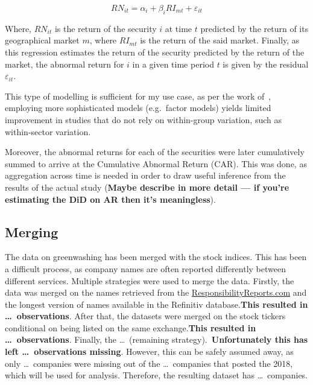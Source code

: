 \documentclass[12pt]{article}
\begin{document}
\begin{equation}\label{eq:reg_market_model}
    RN_{it} = \alpha_i + \beta_{i} RI_{mt} + \varepsilon_{it}
\end{equation}

Where, $RN_{it}$ is the return of the security $i$ at time $t$ predicted by the return of its geographical market $m$, where $RI_{mt}$ is the return of the said market. Finally, as this regression estimates the return of the security predicted by the return of the market, the abnormal return for $i$ in a given time period $t$ is given by the residual $\varepsilon_{it}$.

This type of modelling is sufficient for my use case, as per the work of~\citeauthor{mackinlayEventStudiesEconomics1997}, employing more sophisticated models (e.g.~factor models) yields limited improvement in studies that do not rely on within-group variation, such as within-sector variation.

Moreover, the abnormal returns for each of the securities were later cumulatively summed to arrive at the Cumulative Abnormal Return (CAR). This was done, as aggregation across time is needed in order to draw useful inference from the results of the actual study (\textbf{Maybe describe in more detail --- if you're estimating the DiD on AR then it's meaningless}). 

\subsection{Merging}

The data on greenwashing has been merged with the stock indices. This has been a difficult process, as company names are often reported differently between different services. Multiple strategies were used to merge the data. Firstly, the data was merged on the names retrieved from the \href{https://responsibilityreports.com}{ResponsibilityReports.com} and the longest version of names available in the Refinitiv database.\@ \textbf{This resulted in \dots\ observations}. After that, the datasets were merged on the stock tickers conditional on being listed on the same exchange.\@ \textbf{This resulted in \dots\ observations}. Finally, the \dots\ (remaining strategy).\ \textbf{Unfortunately this has left \dots\ observations missing}. However, this can be safely assumed away, as only \dots\ companies were missing out of the \dots\ companies that posted the 2018, which will be used for analysis. Therefore, the resulting dataset has \dots\ companies. 
\end{document}
